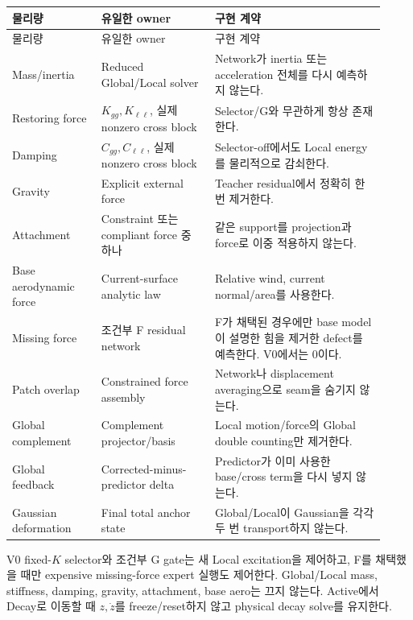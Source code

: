 \documentclass[10pt,a4paper]{article}
\begin{document}
\begin{longtable}{L{0.22\linewidth}L{0.28\linewidth}L{0.42\linewidth}}
\toprule
물리량 & 유일한 owner & 구현 계약 \\
\midrule
\endfirsthead
\toprule
물리량 & 유일한 owner & 구현 계약 \\
\midrule
\endhead
Mass/inertia & Reduced Global/Local solver & Network가 inertia 또는 acceleration 전체를 다시 예측하지 않는다. \\
Restoring force & \(K_{gg},K_{\ell\ell}\), 실제 nonzero cross block & Selector/G와 무관하게 항상 존재한다. \\
Damping & \(C_{gg},C_{\ell\ell}\), 실제 nonzero cross block & Selector-off에서도 Local energy를 물리적으로 감쇠한다. \\
Gravity & Explicit external force & Teacher residual에서 정확히 한 번 제거한다. \\
Attachment & Constraint 또는 compliant force 중 하나 & 같은 support를 projection과 force로 이중 적용하지 않는다. \\
Base aerodynamic force & Current-surface analytic law & Relative wind, current normal/area를 사용한다. \\
Missing force & 조건부 F residual network & F가 채택된 경우에만 base model이 설명한 힘을 제거한 defect를 예측한다. V0에서는 0이다. \\
Patch overlap & Constrained force assembly & Network나 displacement averaging으로 seam을 숨기지 않는다. \\
Global complement & Complement projector/basis & Local motion/force의 Global double counting만 제거한다. \\
Global feedback & Corrected-minus-predictor delta & Predictor가 이미 사용한 base/cross term을 다시 넣지 않는다. \\
Gaussian deformation & Final total anchor state & Global/Local이 Gaussian을 각각 두 번 transport하지 않는다. \\
\bottomrule
\end{longtable}

\begin{tcolorbox}[colback=LightOrange,colframe=orange!60!black,title=Selector가 끄는 것과 끄지 않는 것,fonttitle=\bfseries]
V0 fixed-\(K\) selector와 조건부 G gate는 새 Local excitation을 제어하고, F를 채택했을 때만 expensive missing-force expert 실행도 제어한다.
Global/Local mass, stiffness, damping, gravity, attachment, base aero는 끄지 않는다.
Active에서 Decay로 이동할 때 \(z,\dot z\)를 freeze/reset하지 않고 physical decay solve를 유지한다.
\end{tcolorbox}
\end{document}
